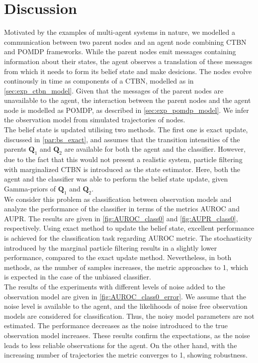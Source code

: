 \chapter{Discussion}
\label{chap:5}
Motivated by the examples of multi-agent systems in nature, we modelled a communication between two parent nodes and an agent node combining CTBN and POMDP frameworks. While the parent nodes emit messages containing information about their states, the agent observes a translation of these messages from which it needs to form its belief state and make desicions. The nodes evolve continously in time as components of a CTBN, modelled as in \cref{sec:exp_ctbn_model}. Given that the messages of the parent nodes are unavailable to the agent, the interaction between the parent nodes and the agent node is modelled as POMDP, as described in \cref{sec:exp_pomdp_model}. We infer the observation model from simulated trajectories of nodes. \\
The belief state is updated utilising two methods. The first one is exact update, discussed in \cref{par:bs_exact}, and assumes that the transition intensities of the parents $ \textbf{Q}_1 $ and $ \textbf{Q}_2 $ are available for both the agent and the classifier. However, due to the fact that this would not present a realistic system, particle filtering with marginalized CTBN is introduced as the state estimator. Here, both the agent and the classifier was able to perform the belief state update, given Gamma-priors of $ \textbf{Q}_1 $ and $ \textbf{Q}_2 $.\\
We consider this problem as classification between observation models and analyze the performance of the classifier in terms of the metrics AUROC and AUPR. The results are given in \autoref{fig:AUROC_class0} and \autoref{fig:AUPR_class0}, respectively. Using exact method to update the belief state, excellent performance is achieved for the classification task regarding AUROC metric. The stochasticity introduced by the marginal particle filtering results in a slightly lower performance, compared to the exact update method. Nevertheless, in both methods, as the number of samples increases, the metric approaches to 1, which is expected in the case of the unbiased classifier.\\
The results of the experiments with different levels of noise added to the observation model are given in \autoref{fig:AUROC_class0_error}. We assume that the noise level is available to the agent, and the likelihoods of noise free observation models are considered for classification. Thus, the noisy model parameters are not estimated. The performance decreases as the noise introduced to the true observation model increases. These results confirm the expectations, as the noise leads to less reliable observations for the agent. On the other hand, with the increasing number of trajectories the metric converges to 1, showing robustness.\\
